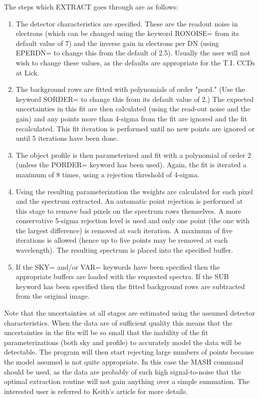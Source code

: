 The steps which EXTRACT goes through are as follows:
\begin{enumerate}
  \item The detector characteristics are specified.  These are the readout
     noise in electrons (which can be changed using the keyword RONOISE=
     from its default value of 7) and the inverse gain in electrons per DN
     (using EPERDN= to change this from the default of 2.5).  Usually the
     user will not wish to change these values, as the defaults are
     appropriate for the T.I. CCDs at Lick.

  \item The background rows are fitted with polynomials of order "pord."
     (Use the keyword SORDER= to change this from its default value of 2.)
     The expected uncertainties in this fit are then calculated (using the
     read-out noise and the gain) and any points more than 4-sigma from the
     fit are ignored and the fit recalculated.  This fit iteration is
     performed until no new points are ignored or until 5 iterations have
     been done.

  \item The object profile is then parameterized and fit with a polynomial
     of order 2 (unless the PORDER= keyword has been used).  Again, the fit
     is iterated a maximum of 8 times, using a rejection threshold of
     4-sigma.

  \item Using the resulting parameterization the weights are calculated for
     each pixel and the spectrum extracted.  An automatic point rejection
     is performed at this stage to remove bad pixels on the spectrum rows
     themselves.  A more conservative 5-sigma rejection level is used and
     only one point (the one with the largest difference) is removed at
     each iteration.  A maximum of five iterations is allowed (hence up to
     five points may be removed at each wavelength).  The resulting
     spectrum is placed into the specified buffer.

  \item If the SKY= and/or VAR= keywords have been specified then the
     appropriate buffers are loaded with the requested spectra.  If the SUB
     keyword has been specified then the fitted background rows are
     subtracted from the original image.
\end{enumerate}

Note that the uncertainties at all stages are estimated using the assumed
detector characteristics.  When the data are of sufficient quality this
means that the uncertainties in the fits will be so small that the
inability of the fit parameterizations (both sky and profile) to accurately
model the data will be detectable.  The program will then start rejecting
large numbers of points because the model assumed is not quite appropriate.
In this case the MASH command should be used, as the data are probably of
such high signal-to-noise that the optimal extraction routine will not gain
anything over a simple summation.  The interested user is referred to
Keith's article for more details.

